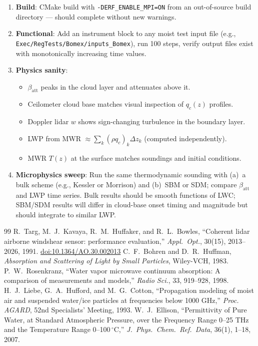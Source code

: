 \documentclass[11pt,letterpaper]{article}
\newcommand{\doi}[1]{\href{https://doi.org/#1}{doi:#1}}
\begin{document}
\begin{enumerate}
  \item \textbf{Build}: CMake build with \texttt{-DERF\_ENABLE\_MPI=ON} from an
        out-of-source build directory --- should complete without new warnings.
  \item \textbf{Functional}: Add an instrument block to any moist test input file
        (e.g., \texttt{Exec/RegTests/Bomex/inputs\_Bomex}), run 100 steps,
        verify output files exist with monotonically increasing time values.
  \item \textbf{Physics sanity}:
  \begin{itemize}
    \item $\beta_\mathrm{att}$ peaks in the cloud layer and attenuates above it.
    \item Ceilometer cloud base matches visual inspection of $q_c(z)$ profiles.
    \item Doppler lidar $w$ shows sign-changing turbulence in the boundary layer.
    \item LWP from MWR $\approx \sum_k (\rho q_c)_k \Delta z_k$ (computed independently).
    \item MWR $T(z)$ at the surface matches soundings and initial conditions.
  \end{itemize}
  \item \textbf{Microphysics sweep}: Run the same thermodynamic sounding with
        (a)~a bulk scheme (e.g., Kessler or Morrison) and (b)~SBM or SDM;
        compare $\beta_\mathrm{att}$ and LWP time series.
        Bulk results should be smooth functions of LWC; SBM/SDM results will differ
        in cloud-base onset timing and magnitude but should integrate to similar LWP.
\end{enumerate}

\begin{thebibliography}{99}
  R.~Targ, M.~J.\ Kavaya, R.~M.\ Huffaker, and R.~L.\ Bowles,
  ``Coherent lidar airborne windshear sensor: performance evaluation,''
  \emph{Appl.\ Opt.}, 30(15), 2013--2026, 1991.
  \doi{10.1364/AO.30.002013}
  C.~F.\ Bohren and D.~R.\ Huffman,
  \emph{Absorption and Scattering of Light by Small Particles},
  Wiley-VCH, 1983.
  P.~W.\ Rosenkranz,
  ``Water vapor microwave continuum absorption: A comparison of measurements and models,''
  \emph{Radio Sci.}, 33, 919--928, 1998.
  H.~J.\ Liebe, G.~A.\ Hufford, and M.~G.\ Cotton,
  ``Propagation modeling of moist air and suspended water/ice particles at frequencies below 1000 GHz,''
  \emph{Proc. AGARD}, 52nd Specialists' Meeting, 1993.
  W.~J.\ Ellison,
  ``Permittivity of Pure Water, at Standard Atmospheric Pressure, over the Frequency Range
  0--25 THz and the Temperature Range 0--100\,$^\circ$C,''
  \emph{J.\ Phys.\ Chem.\ Ref.\ Data}, 36(1), 1--18, 2007.
\end{thebibliography}
\end{document}
